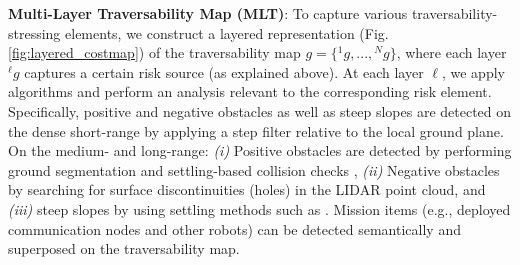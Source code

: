 \documentclass[letterpaper, 10pt, conference]{ieeeconf}      %
\newcommand{\ph}[1]{{\textbf{#1}:}} %
\newcommand{\rev}[1]{{\color{blue}#1}} %
\begin{document}
\ph{Multi-Layer Traversability Map (MLT)}
To capture various traversability-stressing elements, we construct a layered representation (Fig. \ref{fig:layered_costmap}) of the traversability map $g=\{{}^{1}g,...,{}^{N}g\}$, where each layer ${}^{\ell}g$ captures a certain risk source (as explained above). %
At each layer ${\ell}$, we apply algorithms and perform an analysis relevant to the corresponding risk element. 
Specifically, positive and negative obstacles as well as steep slopes are detected on the dense short-range by applying a step filter relative to the local ground plane.
On the medium- and long-range: %
\textit{(i)} Positive obstacles are detected by performing ground segmentation \cite{himmelsbach2010fast} and settling-based collision checks \cite{krusi2017driving}, \textit{(ii)} Negative obstacles by searching for surface discontinuities (holes) in the LIDAR point cloud, and \textit{(iii)} steep slopes by using settling methods such as \cite{krusi2017driving}. Mission items (e.g., deployed communication nodes and other robots) can be detected semantically and superposed on the traversability map.


\end{document}
